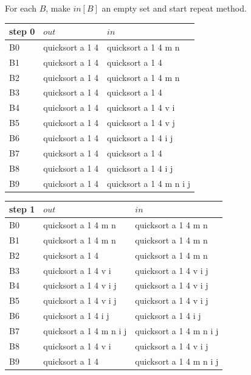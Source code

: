 For each $B$, make $in[B]$ an empty set and 
start repeat method.

\vspace{0.5cm}

\begin{tabular}{|l|l|l|} \hline
step 0  & $out$             & $in$      \\ \hline
B0 & quicksort a 1 4   & quicksort a 1 4 m n \\ \hline
B1 & quicksort a 1 4   & quicksort a 1 4     \\ \hline
B2 & quicksort a 1 4   & quicksort a 1 4 m n \\ \hline
B3 & quicksort a 1 4   & quicksort a 1 4     \\ \hline
B4 & quicksort a 1 4   & quicksort a 1 4 v i \\ \hline
B5 & quicksort a 1 4   & quicksort a 1 4 v j \\ \hline
B6 & quicksort a 1 4   & quicksort a 1 4 i j \\ \hline
B7 & quicksort a 1 4   & quicksort a 1 4     \\ \hline
B8 & quicksort a 1 4   & quicksort a 1 4 i j \\ \hline
B9 & quicksort a 1 4 \hspace{1.7cm}
 & quicksort a 1 4 m n i j  \hspace{0.1cm} \\ \hline
\end{tabular}

\begin{tabular}{|l|l|l|} \hline
step 1  & $out$             & $in$      \\ \hline
B0 & quicksort a 1 4 m n     & quicksort a 1 4 m n   \\ \hline
B1 & quicksort a 1 4 m n     & quicksort a 1 4 m n   \\ \hline
B2 & quicksort a 1 4         & quicksort a 1 4 m n   \\ \hline
B3 & quicksort a 1 4 v i     & quicksort a 1 4 v i j \\ \hline
B4 & quicksort a 1 4 v i j   & quicksort a 1 4 v i j \\ \hline
B5 & quicksort a 1 4 v i j   & quicksort a 1 4 v i j \\ \hline
B6 & quicksort a 1 4 i j     & quicksort a 1 4 i j   \\ \hline
B7 & quicksort a 1 4 m n i j & quicksort a 1 4 m n i j  \\ \hline
B8 & quicksort a 1 4 v i     & quicksort a 1 4 v i j  \\ \hline
B9 & quicksort a 1 4  \hspace{1.7cm}
   & quicksort a 1 4 m n i j  \hspace{0.1cm} \\ \hline
\end{tabular}


